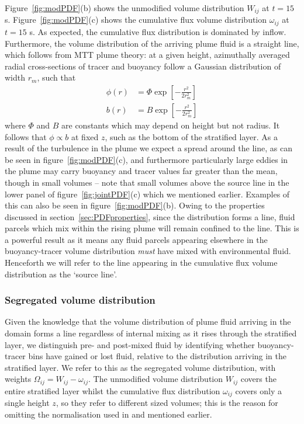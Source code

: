 \documentclass[a4paper]{article}
\begin{document}
Figure~\ref{fig:modPDF}(b) shows the unmodified volume distribution $W_{ij}$ at $t = 15$ s.
Figure~\ref{fig:modPDF}(c) shows the cumulative flux volume distribution $\omega_{ij}$ at $t = 15$ s. As
expected, the cumulative flux distribution is dominated by inflow. Furthermore, the volume distribution of the
arriving plume fluid is a straight line, which follows from MTT plume theory: at a given height, azimuthally
averaged radial cross-sections of tracer and buoyancy follow a Gaussian distribution of width $r_m$, such that
\begin{align}
	\phi(r) &= \Phi \exp \left[ - \frac{r^2}{2r_m^2}\right] \\
	b(r) &= B \exp \left[ - \frac{r^2}{2r_m^2}\right]
\end{align}
where $\Phi$ and $B$ are constants which may depend on height but not radius. It follows that $\phi \propto b$
at fixed $z$, such as the bottom of the stratified layer. As a result of the turbulence in the plume we expect
a spread around the line, as can be seen in figure~\ref{fig:modPDF}(c), and furthermore particularly large
eddies in the plume may carry buoyancy and tracer values far greater than the mean, though in small volumes --
note that small volumes above the source line in the lower panel of figure~\ref{fig:jointPDF}(c) which we
mentioned earlier. Examples of this can also be seen in figure~\ref{fig:modPDF}(b). Owing to the properties
discussed in section~\ref{sec:PDFproperties}, since the distribution forms a line, fluid parcels which mix
within the rising plume will remain confined to the line. This is a powerful result as it means any fluid
parcels appearing elsewhere in the buoyancy-tracer volume distribution \emph{must} have mixed with
environmental fluid. Henceforth we will refer to the line appearing in the cumulative flux volume distribution
as the `source line'.

\subsubsection{Segregated volume distribution}
\label{sec:segjointPDF}

Given the knowledge that the volume distribution of plume fluid arriving in the domain forms a line regardless
of internal mixing as it rises through the stratified layer, we distinguish pre- and post-mixed fluid by
identifying whether buoyancy-tracer bins have gained or lost fluid, relative to the distribution arriving in
the stratified layer. We refer to this as the segregated volume distribution, with weights $\Omega_{ij} =
W_{ij} - \omega_{ij}$.  The unmodified volume distribution $W_{ij}$ covers the entire stratified layer whilst
the cumulative flux distribution $\omega_{ij}$ covers only a single height $z$, so they refer to different
sized volumes; this is the reason for omitting the normalisation used in \citet{penney2020} and mentioned
earlier.
\end{document}

